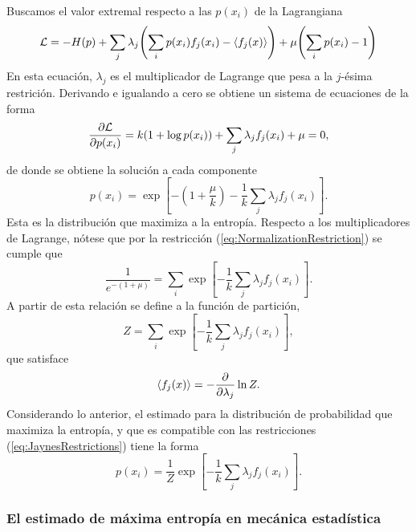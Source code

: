 Buscamos el valor extremal respecto a las $p(x_{i})$ de la Lagrangiana
\begin{equation}
    \mathcal{L}=-H(p)+\sum_{j}\lambda_{j}\qty(\sum_{i}p(x_{i})f_{j}(x_{i})-\expval{f_{j}(x)})+\mu\qty(\sum_{i}p(x_{i})-1)\nonumber
\end{equation}
En esta ecuación, $\lambda_{j}$ es el multiplicador de Lagrange que pesa a la $j$-ésima restrición. Derivando e igualando a cero se obtiene un sistema de ecuaciones de la forma
\begin{equation}
    \frac{\partial \mathcal{L}}{\partial p(x_{i})}=k(1+\log{p(x_{i})})+\sum_{j}\lambda_{j}f_{j}(x_{i})+\mu=0,\nonumber
\end{equation}
de donde se obtiene la solución a cada componente
\begin{equation}
    p(x_{i})=\exp[-(1+\frac{\mu}{k})-\frac{1}{k}\sum_{j}\lambda_{j}f_{j}(x_{i})].\nonumber
\end{equation}
Esta es la distribución que maximiza a la entropía. Respecto a los multiplicadores de Lagrange, nótese que por la restricción (\ref{eq:NormalizationRestriction}) se cumple que
\begin{equation}
    \frac{1}{e^{-(1+\mu)}}=\sum_{i}\exp[-\frac{1}{k}\sum_{j}\lambda_{j}f_{j}(x_{i})].\nonumber
\end{equation}
A partir de esta relación se define a la función de partición,
\begin{equation}
    Z=\sum_{i}\exp[-\frac{1}{k}\sum_{j}\lambda_{j}f_{j}(x_{i})],\nonumber
\end{equation}
que satisface
\begin{equation}
    \expval{f_{j}(x)}=-\frac{\partial}{\partial \lambda_{j}}\ln{Z}.\nonumber
\end{equation}
Considerando lo anterior, el estimado para la distribución de probabilidad que maximiza la entropía, y que es compatible con las restricciones (\ref{eq:JaynesRestrictions}) tiene la forma 
\begin{equation}\label{eq:MaxEntDist}
    p(x_{i})=\frac{1}{Z}\exp[-\frac{1}{k}\sum_{j}\lambda_{j}f_{j}(x_{i})].
\end{equation}

\subsubsection{El estimado de máxima entropía en mecánica estadística}

